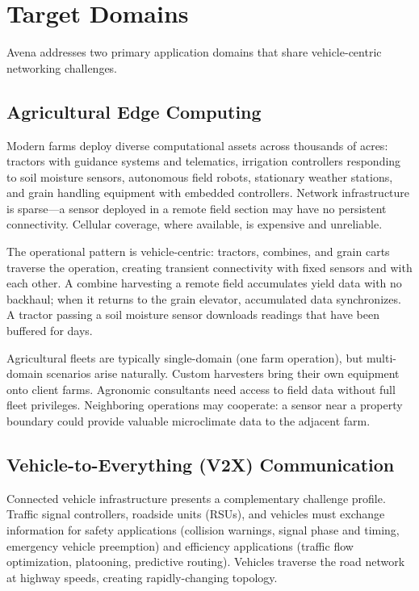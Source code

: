 \section{Target Domains}

Avena addresses two primary application domains that share vehicle-centric networking challenges.

\subsection{Agricultural Edge Computing}

Modern farms deploy diverse computational assets across thousands of acres: tractors with guidance systems and telematics, irrigation controllers responding to soil moisture sensors, autonomous field robots, stationary weather stations, and grain handling equipment with embedded controllers. Network infrastructure is sparse---a sensor deployed in a remote field section may have no persistent connectivity. Cellular coverage, where available, is expensive and unreliable.

The operational pattern is vehicle-centric: tractors, combines, and grain carts traverse the operation, creating transient connectivity with fixed sensors and with each other. A combine harvesting a remote field accumulates yield data with no backhaul; when it returns to the grain elevator, accumulated data synchronizes. A tractor passing a soil moisture sensor downloads readings that have been buffered for days.

Agricultural fleets are typically single-domain (one farm operation), but multi-domain scenarios arise naturally. Custom harvesters bring their own equipment onto client farms. Agronomic consultants need access to field data without full fleet privileges. Neighboring operations may cooperate: a sensor near a property boundary could provide valuable microclimate data to the adjacent farm.

\subsection{Vehicle-to-Everything (V2X) Communication}

Connected vehicle infrastructure presents a complementary challenge profile. Traffic signal controllers, roadside units (RSUs), and vehicles must exchange information for safety applications (collision warnings, signal phase and timing, emergency vehicle preemption) and efficiency applications (traffic flow optimization, platooning, predictive routing). Vehicles traverse the road network at highway speeds, creating rapidly-changing topology.

